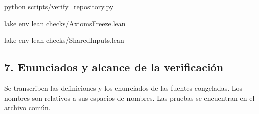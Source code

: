 \documentclass[spanish,11pt,a4paper]{article}
\begin{document}
\begingroup\small\ttfamily\raggedright 
\noindent\hspace*{0.0em}python scripts/verify\_\allowbreak{}repository.py\par
\noindent\hspace*{0.0em}lake env lean checks/AxiomsFreeze.lean\par
\noindent\hspace*{0.0em}lake env lean checks/SharedInputs.lean\par\endgroup

\subsection{7. Enunciados y alcance de la verificación}\label{enunciados-y-alcance-de-la-verificaciuxf3n}

Se transcriben las definiciones y los enunciados de las fuentes congeladas. Los nombres son relativos a sus espacios de nombres. Las pruebas se encuentran en el archivo común.
\end{document}
